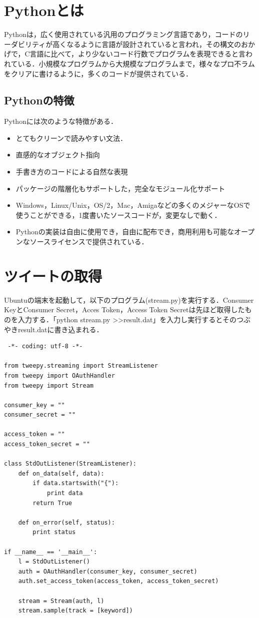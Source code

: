 \section{Pythonとは}
Pythonは，広く使用されている汎用のプログラミング言語であり，コードのリーダビリティが高くなるように言語が設計されていると言われ，その構文のおかげで，C言語に比べて，より少ないコード行数でプログラムを表現できると言われている．小規模なプログラムから大規模なプログラムまで，様々なプロ不ラムをクリアに書けるように，多くのコードが提供されている\cite{Pythonwiki}．


\subsection{Pythonの特徴}

Pythonには次のような特徴がある\cite{Pythontokutyou}．

\begin{itemize}
 \item とてもクリーンで読みやすい文法．
 \item 直感的なオブジェクト指向
 \item 手書き方のコードによる自然な表現
 \item パッケージの階層化もサポートした，完全なモジュール化サポート
 \item Windows，Linux/Unix，OS/2，Mac，Amigaなどの多くのメジャーなOSで使うことができる，1度書いたソースコードが，変更なしで動く．
 \item Pythonの実装は自由に使用でき，自由に配布でき，商用利用も可能なオープンなソースライセンスで提供されている．
\end{itemize}

\clearpage


\section{ツイートの取得}

Ubuntuの端末を起動して，以下のプログラム(stream.py)を実行する．Consumer KeyとConsumer Secret，Acces Token，Access Token Secretは先ほど取得したものを入力する．「python stream.py >>result.dat」を入力し実行するとそのつぶやきresult.datに書き込まれる．
{\small
\begin{lstlisting}
 -*- coding: utf-8 -*-
 
from tweepy.streaming import StreamListener
from tweepy import OAuthHandler
from tweepy import Stream
 
consumer_key = ""
consumer_secret = ""
 
access_token = ""
access_token_secret = ""
 
class StdOutListener(StreamListener):
    def on_data(self, data):
        if data.startswith("{"):
            print data
        return True
 
    def on_error(self, status):
        print status
 
if __name__ == '__main__':
    l = StdOutListener()
    auth = OAuthHandler(consumer_key, consumer_secret)
    auth.set_access_token(access_token, access_token_secret)
 
    stream = Stream(auth, l)
    stream.sample(track = [keyword])
\end{lstlisting}}

